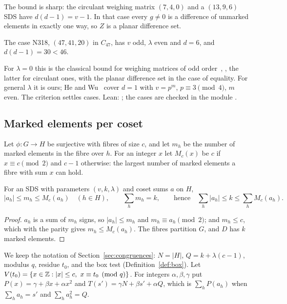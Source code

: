The bound is sharp: the circulant weighing matrix $(7, 4, 0)$ and a $(13, 9, 6)$ SDS have
$d(d-1) = v - 1$. In that case every $g \ne 0$ is a difference of unmarked elements in exactly
one way, so $Z$ is a planar difference set.

\begin{example}
The case N318, $(47, 41, 20)$ in $C_{47}$, has $v$ odd, $\lambda$ even and $d = 6$, and
$d(d-1) = 30 < 46$.
\end{example}

\begin{remark}
For $\lambda = 0$ this is the classical bound for weighing matrices of odd
order~\cite{wallis-whiteman}, \cite[Thm.~1(iii)--(iv)]{arasu-seberry}, the latter for circulant
ones, with the planar difference set in the case of equality. For general $\lambda$ it is ours;
He and Wu~\cite[Cor.~4.5]{he-wu} cover $d = 1$ with $v = p^m$, $p \equiv 3 \pmod 4$, $m$ even.
The criterion settles  cases. Lean:
; the cases are checked in the module
.
\end{remark}

\subsection{Marked elements per coset}
Let $\phi \colon G \to H$ be surjective with fibres of size $c$, and let $m_h$ be the number of
marked elements in the fibre over $h$. For an integer $x$ let $M_c(x)$ be $c$ if
$x \equiv c \pmod 2$ and $c - 1$ otherwise: the largest number of marked elements a fibre with
sum $x$ can hold.

\begin{lemma}\label{lem:marked}
For an SDS with parameters $(v,k,\lambda)$ and coset sums $a$ on $H$,
\[
  |a_h| \le m_h \le M_c(a_h) \quad (h \in H), \qquad \sum_h m_h = k, \qquad
  \text{hence} \quad \sum_h |a_h| \le k \le \sum_h M_c(a_h).
\]
\end{lemma}

\begin{proof}
$a_h$ is a sum of $m_h$ signs, so $|a_h| \le m_h$ and $m_h \equiv a_h \pmod 2$; and
$m_h \le c$, which with the parity gives $m_h \le M_c(a_h)$. The fibres partition $G$, and $D$
has $k$ marked elements.
\end{proof}

We keep the notation of Section~\ref{sec:congruences}: $N = |H|$, $Q = k + \lambda(c - 1)$,
modulus $q$, residue $t_0$, and the box test (Definition~\ref{def:box}). Let
$V(t_0) = \{x \in \mathbb{Z} : |x| \le c,\ x \equiv t_0 \pmod q\}$. For integers $\alpha, \beta, \gamma$
put $P(x) = \gamma + \beta x + \alpha x^2$ and $T(s') = \gamma N + \beta s' + \alpha Q$, which is
$\sum_h P(a_h)$ when $\sum_h a_h = s'$ and $\sum_h a_h^2 = Q$.

